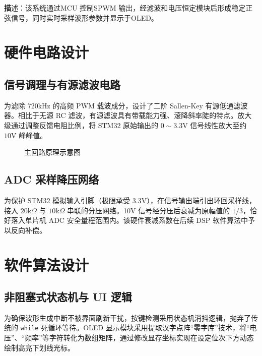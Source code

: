 \documentclass[a4paper,12pt]{ctexart}
\begin{document}
\textbf 描述：该系统通过MCU 控制SPWM 输出，经滤波和电压恒定模块后形成稳定正弦信号，同时实时采样波形参数并显示于OLED。





\section{硬件电路设计}

\subsection{信号调理与有源滤波电路}
为滤除 720kHz 的高频 PWM 载波成分，设计了二阶 Sallen-Key 有源低通滤波器。相比于无源 RC 滤波，有源滤波具有带载能力强、滚降斜率陡的特点。放大级通过调整反馈电阻比例，将 STM32 原始输出的 $0\sim3.3\text{V}$ 信号线性放大至约 $10\text{V}$ 峰峰值。

\begin{figure}[H]
    \centering
    \vspace{5cm} %
    \caption{主回路原理示意图}
\end{figure}

\subsection{ADC 采样降压网络}
为保护 STM32 模拟输入引脚（极限承受 $3.3\text{V}$），在信号输出端引出环回采样线，接入 $20\text{k}\Omega$ 与 $10\text{k}\Omega$ 串联的分压网络。10V 信号经分压后衰减为原幅值的 $1/3$，恰好落入单片机 ADC 安全量程范围内。该硬件衰减系数在后续 DSP 软件算法中予以反向补偿。

\section{软件算法设计}

\subsection{非阻塞式状态机与 UI 逻辑}
为确保波形生成中断不被界面刷新干扰，按键检测采用状态机消抖逻辑，抛弃了传统的 \texttt{while} 死循环等待。OLED 显示模块采用提取汉字点阵“零字库”技术，将“电压”、“频率”等字符转化为数组矩阵，通过修改显存坐标实现在设定位次下方动态绘制高亮下划线光标。
\end{document}
